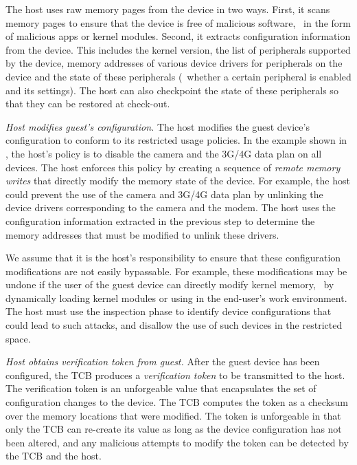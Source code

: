 \begin{mylist}
The host uses raw memory pages from the device in two ways. First, it scans
memory pages to ensure that the device is free of malicious software, \eg~in
the form of malicious apps or kernel modules.  Second, it extracts
configuration information from the device. This includes the kernel version,
the list of peripherals supported by the device, memory addresses of various
device drivers for peripherals on the device and the state of these peripherals
(\eg~whether a certain peripheral is enabled and its settings). The host can
also checkpoint the state of these peripherals so that they can be restored at
check-out. 

\item \textit{Host modifies guest's configuration.} The host modifies the guest
device's configuration to conform to its restricted usage policies.  In the
example shown in , the host's policy is to
disable the camera and the 3G/4G data plan on all devices. The host enforces
this policy by creating a sequence of \textit{remote memory writes} that
directly modify the memory state of the device. For example, the host could
prevent the use of the camera and 3G/4G data plan by unlinking the device
drivers corresponding to the camera and the modem. The host uses the
configuration information extracted in the previous step to determine the
memory addresses that must be modified to unlink these drivers. 

We assume that it is the host's responsibility to ensure that these
configuration modifications are not easily bypassable. For example, these
modifications may be undone if the user of the guest device can directly modify
kernel memory, \eg~by dynamically loading kernel modules or using
 in the end-user's work environment. The host must use the
inspection phase to identify device configurations that could lead to such
attacks, and disallow the use of such devices in the restricted space.

\item \textit{Host obtains verification token from guest.} After the guest
device has been configured, the TCB produces a \textit{verification token} to
be transmitted to the host. The verification token is an unforgeable value that
encapsulates the set of configuration changes to the device. The TCB computes
the token as a checksum over the memory locations that were modified.  The
token is unforgeable in that only the TCB can re-create its value as long as
the device configuration has not been altered, and any malicious attempts to
modify the token can be detected by the TCB and the host.


\end{mylist}
